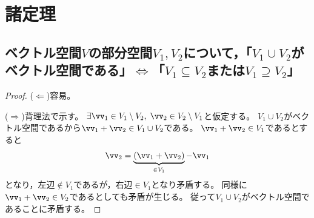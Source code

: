     \section{諸定理}
        \subsection{ベクトル空間\texorpdfstring{$V$}{V}の部分空間\texorpdfstring{$V_1,V_2$}{V1, V2}について，「\texorpdfstring{$V_1\cup V_2$}{V1∪V2}がベクトル空間である」\texorpdfstring{$\iff$}{⇔}「\texorpdfstring{$V_1\subseteq V_2$}{V1⊆V2}または\texorpdfstring{$V_1 \supseteq V_2$}{V1⊇V2}」}
            \begin{proof}
                ($\Leftarrow$)容易。
                \par
                ($\Rightarrow$)背理法で示す。
                $\exists \vv_1\in V_1\setminus V_2, \;\vv_2\in V_2\setminus V_1$と仮定する。
                $V_1\cup V_2$がベクトル空間であるから$\vv_1 + \vv_2 \in V_1\cup V_2$である。
                $\vv_1 + \vv_2 \in V_1$であるとすると
                \[ \vv_2 = \underbrace{(\vv_1 + \vv_2)}_{\in V_1} - \vv_1 \]
                となり，左辺$\notin V_1$であるが，右辺$\in V_1$となり矛盾する。
                同様に$\vv_1 + \vv_2 \in V_2$であるとしても矛盾が生じる。
                従って$V_1\cup V_2$がベクトル空間であることに矛盾する。
            \end{proof}
